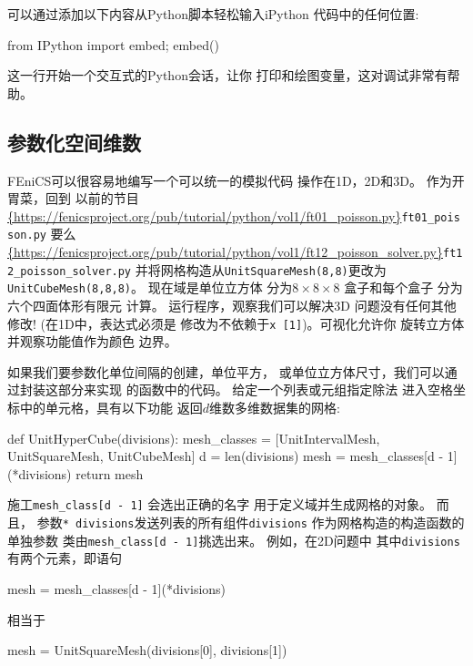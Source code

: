 \begin{notice}[提示:使用iPython进行调试]
可以通过添加以下内容从Python脚本轻松输入iPython
代码中的任何位置:
\begin{python}
from IPython import embed; embed()
\end{python}
这一行开始一个交互式的Python会话，让你
打印和绘图变量，这对调试非常有帮助。
\end{notice}

\subsection{参数化空间维数}
\label{ch:poisson0:nD}


FEniCS可以很容易地编写一个可以统一的模拟代码
操作在1D，2D和3D。 作为开胃菜，回到
以前的节目
\url{{https://fenicsproject.org/pub/tutorial/python/vol1/ft01_poisson.py}}{\nolinkurl{ft01_poisson.py}}
要么
\url{{https://fenicsproject.org/pub/tutorial/python/vol1/ft12_poisson_solver.py}}{\nolinkurl{ft12_poisson_solver.py}}
并将网格构造从\texttt{UnitSquareMesh(8,8)}更改为
\texttt{UnitCubeMesh(8,8,8)}。 现在域是单位立方体
分为$8\times 8\times 8$
盒子和每个盒子
分为六个四面体形有限元
计算。 运行程序，观察我们可以解决3D
问题没有任何其他修改! (在1D中，表达式必须是
修改为不依赖于\texttt{x [1]})。可视化允许你
旋转立方体并观察功能值作为颜色
边界。

如果我们要参数化单位间隔的创建，单位平方，
或单位立方体尺寸，我们可以通过封装这部分来实现
的函数中的代码。 给定一个列表或元组指定除法
进入空格坐标中的单元格，具有以下功能
返回$d$维数多维数据集的网格:

\begin{python}
def UnitHyperCube(divisions):
    mesh_classes = [UnitIntervalMesh, UnitSquareMesh, UnitCubeMesh]
    d = len(divisions)
    mesh = mesh_classes[d - 1](*divisions)
    return mesh
\end{python}
施工\verb!mesh_class[d - 1]! 会选出正确的名字
用于定义域并生成网格的对象。 而且，
参数\texttt{* divisions}发送列表的所有组件\texttt{divisions}
作为网格构造的构造函数的单独参数
类由\verb!mesh_class[d - 1]!挑选出来。 例如，在2D问题中
其中\texttt{divisions}有两个元素，即语句

\begin{python}
mesh = mesh_classes[d - 1](*divisions)
\end{python}
相当于

\begin{python}
mesh = UnitSquareMesh(divisions[0], divisions[1])
\end{python}

